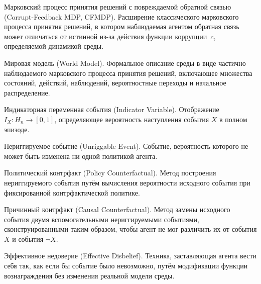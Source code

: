 \begin{definition}
    \label{def:cfmdp}
    Марковский процесс принятия решений с повреждаемой обратной связью 
    (Corrupt-Feedback MDP, CFMDP). Расширение классического марковского процесса
    принятия решений, в котором наблюдаемая агентом обратная связь может отличаться 
    от истинной из-за действия функции коррупции~$c$, определяемой динамикой среды.
\end{definition}


\begin{definition}
    \label{def:worldmodel}
    Мировая модель (World Model). Формальное описание среды в виде частично 
    наблюдаемого марковского процесса принятия решений, включающее множества 
    состояний, действий, наблюдений, вероятностные переходы и начальное распределение.
\end{definition}

\begin{definition}
    \label{def:indicator}
    Индикаторная переменная события (Indicator Variable). Отображение 
    $I_X : H_n \to [0,1]$, определяющее вероятность наступления события $X$ 
    в полном эпизоде.
\end{definition}

\begin{definition}
    \label{def:unriggable}
    Нериггируемое событие (Unriggable Event). Событие, вероятность которого не 
    может быть изменена ни одной политикой агента.
\end{definition}

\begin{definition}
    \label{def:policycounterfactual}
    Политический контрфакт (Policy Counterfactual). Метод построения 
    нериггируемого события путём вычисления вероятности исходного события 
    при фиксированной контрфактической политике.
\end{definition}

\begin{definition}
    \label{def:causalcf}
    Причинный контрфакт (Causal Counterfactual). Метод замены исходного события 
    двумя вспомогательными нериггируемыми событиями, сконструированными таким 
    образом, чтобы агент не мог различить их от события $X$ и события $\lnot X$.
\end{definition}

\begin{definition}
    \label{def:beliefshift}
    Эффективное недоверие (Effective Disbelief). Техника, заставляющая агента 
    вести себя так, как если бы событие было невозможно, путём модификации 
    функции вознаграждения без изменения реальной модели среды.
\end{definition}

